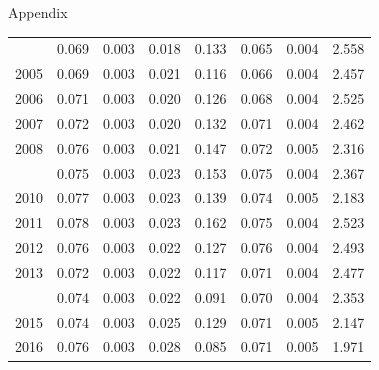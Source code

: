 \documentclass[10pt,ignorenonframetext,]{beamer}
\begin{document}
\begin{frame}[allowframebreaks]{Appendix}
\begin{longtable}[t]{rrrrrrrl}
\addlinespace
2004 & 0.069 & 0.003 & 0.018 & 0.133 & 0.065 & 0.004 & 2.558\\
2005 & 0.069 & 0.003 & 0.021 & 0.116 & 0.066 & 0.004 & 2.457\\
2006 & 0.071 & 0.003 & 0.020 & 0.126 & 0.068 & 0.004 & 2.525\\
2007 & 0.072 & 0.003 & 0.020 & 0.132 & 0.071 & 0.004 & 2.462\\
2008 & 0.076 & 0.003 & 0.021 & 0.147 & 0.072 & 0.005 & 2.316\\
\addlinespace
2009 & 0.075 & 0.003 & 0.023 & 0.153 & 0.075 & 0.004 & 2.367\\
2010 & 0.077 & 0.003 & 0.023 & 0.139 & 0.074 & 0.005 & 2.183\\
2011 & 0.078 & 0.003 & 0.023 & 0.162 & 0.075 & 0.004 & 2.523\\
2012 & 0.076 & 0.003 & 0.022 & 0.127 & 0.076 & 0.004 & 2.493\\
2013 & 0.072 & 0.003 & 0.022 & 0.117 & 0.071 & 0.004 & 2.477\\
\addlinespace
2014 & 0.074 & 0.003 & 0.022 & 0.091 & 0.070 & 0.004 & 2.353\\
2015 & 0.074 & 0.003 & 0.025 & 0.129 & 0.071 & 0.005 & 2.147\\
2016 & 0.076 & 0.003 & 0.028 & 0.085 & 0.071 & 0.005 & 1.971\\*
\end{longtable}\endgroup{}

\end{frame}
\end{document}
